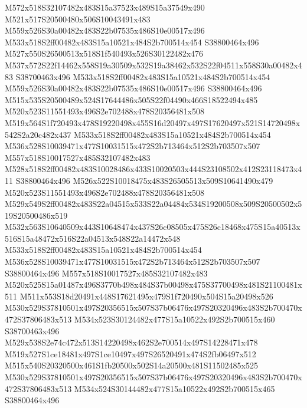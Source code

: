 \documentclass{article}
\begin{document}
\begin{multicols}{2}
M572x518S32107482x483S15a37523x489S15a37549x490 M521x517S20500480x506S10043491x483 M559x526S30a00482x483S22b07535x486S10e00517x496 M533x518S2ff00482x483S15a10521x484S2b700514x454 S38800464x496 M527x550S26500513x518S1f540493x526S30122482x476 M537x572S22f14462x558S19a30509x532S19a38462x532S22f04511x558S30a00482x483 S38700463x496 M533x518S2ff00482x483S15a10521x484S2b700514x454 M559x526S30a00482x483S22b07535x486S10e00517x496 S38800464x496 M515x535S20500489x524S17644486x505S22f04490x466S18522494x485 M520x523S11551493x496S2e702488x478S20356481x508 M519x564S1f720493x478S19220498x455S16d20497x497S17620497x521S14720498x542S2a20c482x437 M533x518S2ff00482x483S15a10521x484S2b700514x454 M536x528S10039471x477S10031515x472S2b713464x512S2b703507x507 M557x518S10017527x485S32107482x483 M528x518S2ff00482x483S10028486x433S10020503x444S23108502x412S23118473x411 S38800464x496 M526x522S10018475x483S26505513x509S10641490x479 M520x523S11551493x496S2e702488x478S20356481x508 M529x549S2ff00482x483S22a04515x533S22a04484x534S19200508x509S20500502x519S20500486x519 M532x563S10640509x443S10648474x437S26c08505x475S26c18468x475S15a40513x516S15a48472x516S22a04513x548S22a14472x548 M533x518S2ff00482x483S15a10521x484S2b700514x454 M536x528S10039471x477S10031515x472S2b713464x512S2b703507x507 S38800464x496 M557x518S10017527x485S32107482x483 M520x525S15a01487x496S3770b498x484S37b00498x475S37700498x481S21100481x511 M511x553S18d20491x448S17621495x479S1f720490x504S15a20498x526 M530x529S37810501x497S20356515x507S37b06476x497S20320496x483S2b700470x472S37806483x513 M534x523S30124482x477S15a10522x492S2b700515x460 S38700463x496 M529x538S2e74c472x513S14220498x462S2e700514x497S14228471x478 M519x527S1ce18481x497S1ce10497x497S26520491x474S2fb06497x512 M515x540S20320500x461S1fb20500x502S14a20500x481S11502485x525 M530x529S37810501x497S20356515x507S37b06476x497S20320496x483S2b700470x472S37806483x513 M534x524S30144482x477S15a10522x492S2b700515x465 S38800464x496





\end{multicols}
\end{document}
